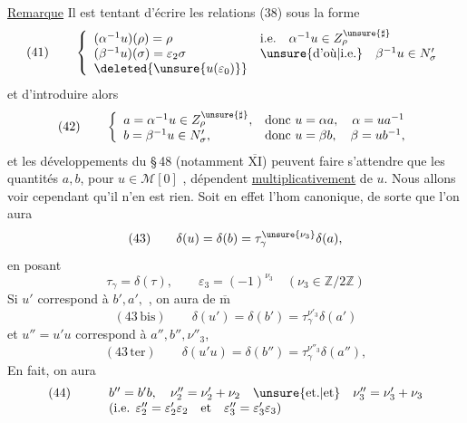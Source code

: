 \uline{Remarque} Il est tentant d'écrire les 
relations (38) sous la forme
\[
(41)\qquad
\left\{\begin{array}{ll}
(\alpha^{-1}u)(\rho)=\rho
  & \text{i.e.}\quad \alpha^{-1}u\in Z_\rho^{\unsure{\sharp}}\\
(\beta^{-1}u)(\sigma)=\varepsilon_2\sigma
  & \unsure{\text{d'où}|\text{i.e.}}\quad \beta^{-1}u\in N'_\sigma\\
\deleted{\unsure{u(\varepsilon_0)}} &
\end{array}\right.
\]
et d'introduire alors
\[
(42)\qquad
\left\{\begin{array}{ll}
a=\alpha^{-1}u\in Z_\rho^{\unsure{\sharp}},
  & \text{donc }u=\alpha a,\quad \alpha=ua^{-1}\\
b=\beta^{-1}u\in N'_\sigma,
  & \text{donc }u=\beta b,\quad \beta=ub^{-1},
\end{array}\right.
\]
et les développements du \S\,48 (notamment
\uline{\(\overline{\mathrm{XI}}\)}) peuvent faire s'attendre que les
quantités \(a,b\), pour \(u\in\mathcal{M}[0]\) ,
dépendent \uline{multiplicativement} de \(u\). Nous allons voir cependant
qu'il n'en est rien. Soit en effet
l'hom canonique, de sorte que l'on aura
\[
(43)\qquad
\delta(u)=\delta(b)=\tau_\gamma^{\unsure{\nu_3}}\delta(a),
\]
en posant
\[
\tau_\gamma=\delta(\tau),\qquad
\varepsilon_3=(-1)^{\nu_3}\quad
(\nu_3\in\mathbb Z/2\mathbb Z)
\]
Si \(u'\) correspond à \(b',a',\) , on aura de
\(\overline{\mathrm m}\)
\[
(43\,\mathrm{bis})\qquad
\delta(u')=\delta(b')=\tau_\gamma^{\nu'_3}\delta(a')
\]
et  \(u''=u'u\) correspond à \(a'',b'',\nu''_3\),
\[
(43\,\mathrm{ter})\qquad
\delta(u'u)=\delta(b'')=\tau_\gamma^{\nu''_3}\delta(a''),
\]
En fait, on aura
\[
\begin{array}{rl}
(44)\qquad & b''=b'b,\quad \nu''_2=\nu'_2+\nu_2\quad
 \unsure{\text{et.}|\text{et}}\quad \nu''_3=\nu'_3+\nu_3\\
& (\text{i.e. }\varepsilon''_2=\varepsilon'_2\varepsilon_2
\quad\text{et}\quad\varepsilon''_3=\varepsilon'_3\varepsilon_3)
\end{array}
\]

